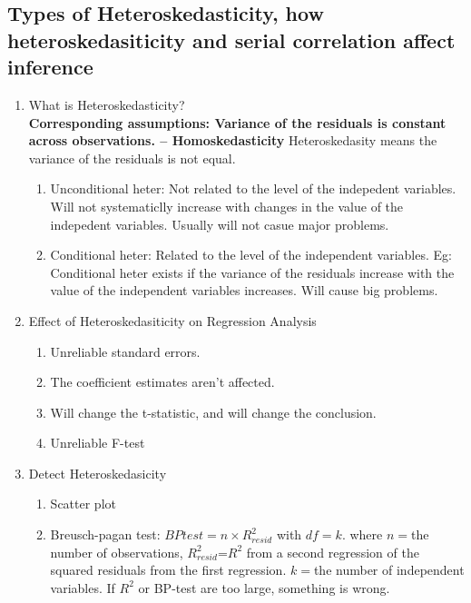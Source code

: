 \documentclass{article}
\begin{document}
\subsection{Types of Heteroskedasticity, how heteroskedasiticity and serial correlation affect inference}
\begin{enumerate}
    \item What is Heteroskedasticity?
        \\ {\bf Corresponding assumptions: Variance of the residuals is constant across observations. -- Homoskedasticity} 
        Heteroskedasity means the variance of the residuals is not equal.
        \begin{enumerate}
            \item Unconditional heter: Not related to the level of the indepedent
                variables. Will not systematiclly increase with changes in the value
                of the indepedent variables. {\color{red}Usually will not casue major problems.}
            \item Conditional heter: Related to the level of the independent variables. Eg:
                Conditional heter exists if the variance of the residuals increase with 
                the value of the independent variables increases. {\color{red}Will cause big problems.}
        \end{enumerate}
    \item Effect of Heteroskedasiticity on Regression Analysis
        \begin{enumerate}
            \item Unreliable standard errors.
            \item The coefficient estimates aren't affected.
            \item Will change the t-statistic, and will change the conclusion.
            \item Unreliable F-test
        \end{enumerate}
    \item Detect Heteroskedasicity
        \begin{enumerate}
            \item Scatter plot
            \item Breusch-pagan test: $BP test = n\times R^2_{resid}$ with $df=k$. 
                where $n=$the number of observations, $R^2_{resid}$=$R^2$ from a second
                regression of the squared residuals from the first regression. $k=$the number
                of independent variables. If $R^2$ or BP-test are too large, something is wrong.

\end{enumerate}
\end{enumerate}
\end{document}
